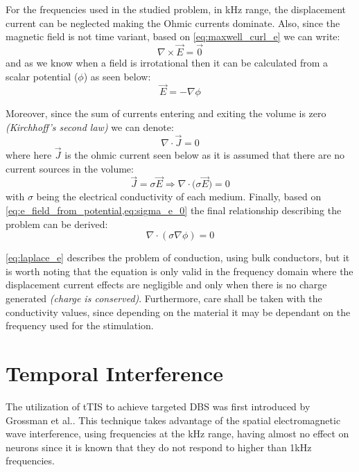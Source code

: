 For the frequencies used in the studied problem, in \si{kHz} range, the displacement current can be neglected making the Ohmic currents dominate. Also, since the magnetic field is not time variant, based on \autoref{eq:maxwell_curl_e} we can write:
\begin{equation}
    \label{eq:curl_zero_e_field}
    \nabla\times\vec{E} = \vec{0}
\end{equation}
and as we know when a field is irrotational then it can be calculated from a scalar potential ($\phi$) as seen below:
\begin{equation}
    \label{eq:e_field_from_potential}
    \boxed{\vec{E} = -\nabla\phi}
\end{equation}

\noindent Moreover, since the sum of currents entering and exiting the volume is zero \textit{(Kirchhoff's second law)} we can denote:
\begin{equation}
    \nabla\cdot\vec{J} = 0
\end{equation}
where here $\vec{J}$ is the ohmic current seen below as it is assumed that there are no current sources in the volume:
\begin{equation}
    \label{eq:sigma_e_0}
    \vec{J} = \sigma\vec{E}\Rightarrow\boxed{\nabla\cdot\big(\sigma\vec{E}\big) = 0}
\end{equation}
with $\sigma$ being the electrical conductivity of each medium. Finally, based on \cref{eq:e_field_from_potential,eq:sigma_e_0} the final relationship describing the problem can be derived:
\begin{equation}
    \label{eq:laplace_e}
    \boxed{\nabla\cdot(\sigma\nabla\phi) = 0}
\end{equation}

\autoref{eq:laplace_e} describes the problem of conduction, using bulk conductors, but it is worth noting that the equation is only valid in the frequency domain where the displacement current effects are negligible and only when there is no charge generated \textit{(charge is conserved)}. Furthermore, care shall be taken with the conductivity values, since depending on the material it may be dependant on the frequency used for the stimulation.

\pagebreak
\section{Temporal Interference}
The utilization of \gls{tTIS} to achieve targeted \gls{DBS} was first introduced by Grossman et al.\cite{Grossman2017}. This technique takes advantage of the spatial electromagnetic wave interference, using frequencies at the \si{kHz} range, having almost no effect on neurons since it is known that they do not respond to higher than 1\si{kHz}  frequencies.
\\\vspace{1pt}

